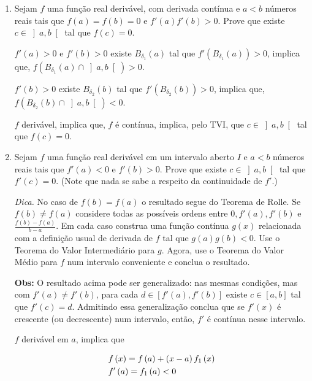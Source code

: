 \documentclass[11pt, oneside, a4paper]{gsm-l}
\begin{document}
\begin{enumerate}
  \item Sejam $f$ uma fun\c{c}ão real derivável, com derivada contínua e $a<b$ n\'umeros reais tais que $f(a) = f(b) = 0$ e $f'(a) f'(b) > 0$. Prove que existe $c \in \left] {a,b} \right[$ tal que $f(c)=0$.

\begin{sol}
$f'(a)>0$ e $f'(b)>0$ existe $B_{\delta _1 }(a)$ tal que $f'\left( {B_{\delta _1 } \left( a \right)} \right) > 0$, implica que, $f\left( {B_{\delta _1 } \left( a \right) \cap \left] {a,b} \right[} \right) > 0$.

$f'(b)>0$ existe $B_{\delta _2 }(b)$ tal que $f'\left( {B_{\delta _2 } \left( b \right)} \right) > 0$, implica que, $f\left( {B_{\delta _2 } \left( b \right) \cap \left] {a,b} \right[} \right) < 0$.

$f$ derivável, implica que, $f$ é contínua, implica, pelo TVI, que $c \in \left] {a,b} \right[$ tal que $f(c) = 0$.
\end{sol}

  \item Sejam $f$ uma fun\c{c}ão real derivável em um intervalo aberto $I$ e $a<b$ n\'umeros reais tais que $f'(a) < 0$ e $f'(b) > 0$. Prove que existe $c \in \left] {a,b} \right[$ tal que $f'(c)=0$. (Note que nada se sabe a respeito da continuidade de $f'$.)

      \textit{Dica.} No caso de $f(b) = f(a)$ o resultado segue do Teorema de Rolle. Se $f(b) \ne f(a)$ considere todas as possíveis ordens entre $0,f'(a),f'(b)$ e $\displaystyle \frac{{f\left( b \right) - f\left( a \right)}}{{b - a}}$. Em cada caso construa uma fun\c{c}ão contínua $g(x)$ relacionada com a defini\c{c}ão usual de derivada de $f$ tal que $g(a)g(b)<0$. Use o Teorema do Valor Intermediário para $g$. Agora, use o Teorema do Valor Médio para $f$ num intervalo conveniente e conclua o resultado.

      \textbf{Obs:} O resultado acima pode ser generalizado: nas mesmas condi\c{c}ões, mas com $f'(a) \ne f'(b)$, para cada $d \in \left[ {f'\left( a \right),f'\left( b \right)} \right]$ existe $c \in \left[ {a,b} \right]$ tal que $f'(c)=d$. Admitindo essa generaliza\c{c}ão conclua que se $f'(x)$ é crescente (ou decrescente) num intervalo, então, $f'$ é contínua nesse intervalo.

\begin{sol}
$f$ derivável em $a$, implica que

\[
\begin{gathered}
f\left( x \right) = f\left( a \right) + \left( {x - a} \right)f_1 \left( x \right) \hfill \\
f'\left( a \right) = f_1 \left( a \right) < 0 \hfill \\
\end{gathered}
\]


\end{sol}
\end{enumerate}
\end{document}
